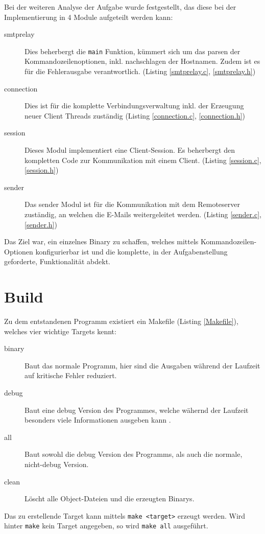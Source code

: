 \documentclass[pdftex,final,a4paper,10pt,notitlepage,halfparskip]{scrreprt}
\begin{document}
Bei der weiteren Analyse der Aufgabe wurde festgestellt, das diese bei der Implementierung in 4 Module aufgeteilt werden kann:
\begin{description}
  \item[smtprelay]
    Dies beherbergt die \texttt{main} Funktion, kümmert sich um das parsen der Kommandozeilenoptionen, inkl. nachschlagen der Hostnamen. Zudem ist es für die Fehlerausgabe verantwortlich. (Listing \ref{smtprelay.c}, \ref{smtprelay.h}) 
  \item[connection] 
    Dies ist für die komplette Verbindungsverwaltung inkl. der Erzeugung neuer Client Threads zuständig (Listing \ref{connection.c}, \ref{connection.h})
  \item[session] 
    Dieses Modul implementiert eine Client-Session. Es beherbergt den kompletten Code zur Kommunikation mit einem Client. (Listing \ref{session.c}, \ref{session.h})
  \item[sender] 
    Das sender Modul ist für die Kommunikation mit dem Remoteserver zuständig, an welchen die E-Mails weitergeleitet werden. (Listing \ref{sender.c}, \ref{sender.h})
\end{description}

Das Ziel war, ein einzelnes Binary zu schaffen, welches mittels Kommandozeilen-Optionen konfigurierbar ist und die komplette, in der Aufgabenstellung geforderte, Funktionalität abdekt.

\section{Build}\label{build}
Zu dem entstandenen Programm existiert ein Makefile (Listing \ref{Makefile}), welches vier wichtige Targets kennt:
\begin{description}
  \item[binary] Baut das normale Programm, hier sind die Ausgaben während der Laufzeit auf kritische Fehler reduziert. 
  \item[debug] Baut eine debug Version des Programmes, welche wähernd der Laufzeit besonders viele Informationen ausgeben kann .
  \item[all] Baut sowohl die debug Version des Programms, als auch die normale, nicht-debug Version.
  \item[clean] Löscht alle Object-Dateien und die erzeugten Binarys. 
\end{description}
Das zu erstellende Target kann mittels \texttt{make <target>} erzeugt werden. Wird hinter \texttt{make} kein Target angegeben, so wird \texttt{make all} ausgeführt.
\end{document}

